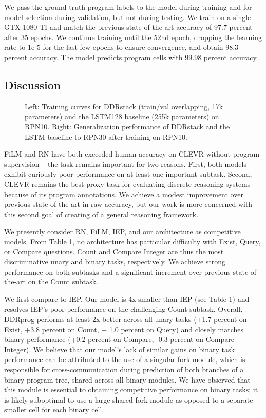 \documentclass{article}
\begin{document}
We pass the ground truth program labels to the model during training and for model selection during validation, but not during testing. We train on a single GTX 1080 TI and match the previous state-of-the-art accuracy of 97.7 percent after 35 epochs. We continue training until the 52nd epoch, dropping the learning rate to 1e-5 for the last few epochs to ensure convergence, and obtain 98.3 percent accuracy. The model predicts program cells with 99.98 percent accuracy.

\subsection{Discussion}
\begin{figure*}
\centering
{}
\hspace{4mm}
\vspace{-3mm}
\caption{Left: Training curves for DDRstack (train/val overlapping, 17k parameters) and the LSTM128 baseline (255k parameters) on RPN10. Right: Generalization performance of DDRstack and the LSTM baseline to RPN30 after training on RPN10.}
\vspace{-3mm}
\end{figure*}
FiLM and RN have both exceeded human accuracy on CLEVR without program supervision -- the task remains important for two reasons. First, both models exhibit curiously poor performance on at least one important subtask. Second, CLEVR remains the best proxy task for evaluating discrete reasoning systems because of its program annotations. We achieve a modest improvement over previous state-of-the-art in raw accuracy, but our work is more concerned with this second goal of creating of a general reasoning framework.

We presently consider RN, FiLM, IEP, and our architecture as competitive models. From Table 1, no architecture has particular difficulty with Exist, Query, or Compare questions. Count and Compare Integer are thus the most discriminative unary and binary tasks, respectively. We achieve strong performance on both subtasks and a significant increment over previous state-of-the-art on the Count subtask.

We first compare to IEP. Our model is 4x smaller than IEP (see Table 1) and resolves IEP's poor performance on the challenging Count subtask. Overall, DDRprog performs at least 2x better across all unary tasks (+1.7 percent on Exist, +3.8 percent  on Count, + 1.0 percent on Query) and closely matches binary performance (+0.2 percent on Compare, -0.3 percent on Compare Integer). We believe that our model's lack of similar gains on binary task performance can be attributed to the use of a singular fork module, which is responsible for cross-communication during prediction of both branches of a binary program tree, shared across all binary modules. We have observed that this module is essential to obtaining competitive performance on binary tasks; it is likely suboptimal to use a large shared fork module as opposed to a separate smaller cell for each binary cell.
\end{document}
